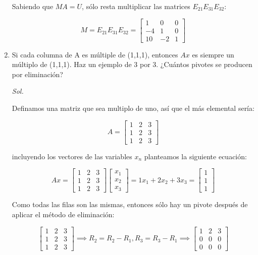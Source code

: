 \begin{enumerate}
	      Sabiendo que $MA=U$, sólo resta multiplicar las matrices $E_{21}E_{31}E_{32}$:


	      \begin{equation}
		      M= E_{21}E_{31}E_{32} = \begin{bmatrix}
			      1 & 0 & 0 \\ -4& 1& 0 \\10& -2& 1
		      \end{bmatrix}
	      \end{equation}

	\item Si cada columna de A es múltiple de (1,1,1), entonces $Ax$ es siempre un múltiplo de
	      (1,1,1). Haz un ejemplo de 3 por 3. ¿Cuántos pivotes se producen por eliminación?

	      \textit{ Sol. }

	      Definamos una matriz que sea multiplo de uno, así que el más elemental sería:

	      \begin{equation*}
		      A=\begin{bmatrix}
			      1 & 2 & 3 \\1&2&3\\1&2&3
		      \end{bmatrix}
	      \end{equation*}

	      incluyendo los vectores de las variables $x_{n}$ planteamos la siguiente ecuación:

	      \begin{equation}
		      Ax=\begin{bmatrix}
			      1 & 2 & 3 \\1&2&3\\1&2&3
		      \end{bmatrix} \begin{bmatrix}
			      x_1\\x_2 \\x_{3}
		      \end{bmatrix}= 1x_1+2x_2+ 3x_{3}= \begin{bmatrix}
			      1 \\1\\1
		      \end{bmatrix}
	      \end{equation}

	      Como todas las filas son las mismas, entonces sólo hay un pivote después de aplicar el método de eliminación:

	      \begin{equation}
		      \begin{bmatrix}
			      1 & 2 & 3 \\1&2&3\\1&2&3
		      \end{bmatrix} \implies R_2 =R_2 -R_{1}, R_{3}=R_{3}-R_1\implies     \begin{bmatrix}
			      1 & 2 & 3 \\0&0&0\\0&0&0
		      \end{bmatrix}
	      \end{equation}


\end{enumerate}
